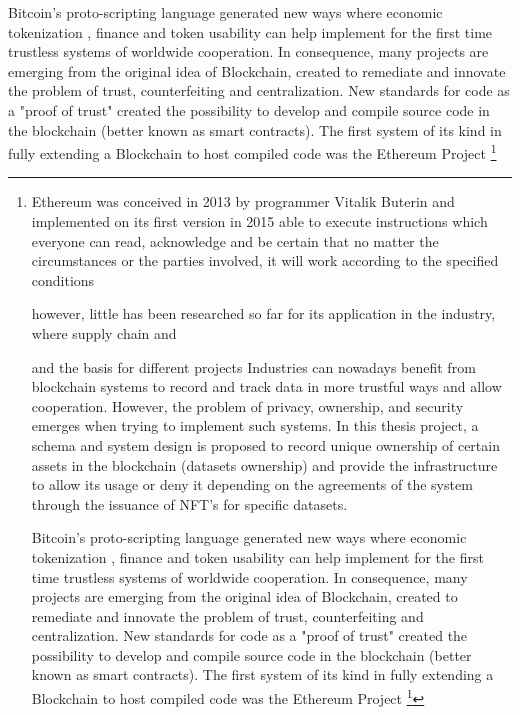 Bitcoin's proto-scripting language generated new ways where economic tokenization \cite{malinova2018tokenomics}, finance and token usability can help implement for the first time trustless systems of worldwide cooperation. In consequence, many projects are emerging from the original idea of Blockchain, created to remediate and innovate the problem of trust, counterfeiting and centralization. New standards for code as a "proof of trust" created the possibility to develop and compile source code in the blockchain (better known as smart contracts). The first system of its kind in fully extending a Blockchain to host compiled code was the Ethereum Project \footnote{Ethereum was conceived in 2013 by programmer Vitalik Buterin and implemented on its first version in 2015\cite{Ethereum30:online} able to execute instructions which everyone can read, acknowledge and be certain that no matter the circumstances or the parties involved, it will work according to the specified conditions

 however, little has been researched so far for its application in the industry, where supply chain and 

  and the basis for different projects 
Industries can nowadays benefit from blockchain systems to record and track data in more trustful ways and allow cooperation. However, the problem of privacy, ownership, and security emerges when trying to implement such systems. In this thesis project, a schema and system design is proposed to record unique ownership of certain assets in the blockchain (datasets ownership) and provide the infrastructure to allow its usage or deny it depending on the agreements of the system through the issuance of NFT's for specific datasets.





Bitcoin's proto-scripting language generated new ways where economic tokenization \cite{malinova2018tokenomics}, finance and token usability can help implement for the first time trustless systems of worldwide cooperation. In consequence, many projects are emerging from the original idea of Blockchain, created to remediate and innovate the problem of trust, counterfeiting and centralization. New standards for code as a "proof of trust" created the possibility to develop and compile source code in the blockchain (better known as smart contracts). The first system of its kind in fully extending a Blockchain to host compiled code was the Ethereum Project \footnote{

 however, little has been researched so far for its application in the industry, where supply chain and 

}}
